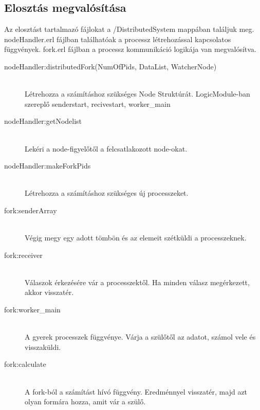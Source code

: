 \subsection{Elosztás megvalósítása}
	Az elosztást tartalmazó fájlokat a /DistributedSystem mappában találjuk meg. nodeHandler.erl fájlban találhatóak a processz létrehozással kapcsolatos függvények. fork.erl fájlban a processz kommunikáció logikája van megvalósítva.
	\begin{description}
		\item[nodeHandler:distributedFork(NumOfPids, DataList, WatcherNode)]
		\hfill \\
		Létrehozza a számításhoz szükséges Node Struktúrát.
		LogicModule-ban szereplő senderstart, recivestart, worker\_main 
		\item[nodeHandler:getNodelist]
		\hfill \\
		Lekéri a node-figyelőtől a felcsatlakozott node-okat.
		\item[nodeHandler:makeForkPids]
		\hfill \\
		Létrehozza a számításhoz szükséges új processzeket.

		\item[fork:senderArray]
		\hfill \\ 
			Végig megy egy adott tömbön és az elemeit szétküldi a processzeknek. 
		\item[fork:receiver]
		\hfill \\
			Válaszok érkezésére vár a processzektől. Ha minden válasz megérkezett, akkor visszatér.
		\item[fork:worker\_main]
		\hfill \\
			A gyerek processzek függvénye. Várja a szülőtől az adatot, számol vele és visszaküldi.
		\item[fork:calculate]
		\hfill \\ 
			A fork-ból a számítást hívó függvény. Eredménnyel visszatér, majd azt olyan formára hozza, amit vár a szülő. 
	\end{description}